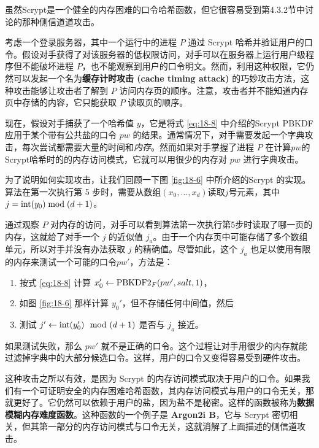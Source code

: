 虽然Scrypt是一个健全的内存困难的口令哈希函数，但它很容易受到第4.3.2节中讨论的那种侧信道道攻击。

考虑一个登录服务器，其中一个运行中的进程 $P$ 通过 Scrypt 哈希并验证用户的口令。假设对手获得了对该服务器的低权限访问，对手可以在服务器上运行用户级程序但不能破坏进程 $P$，也不能观察到用户的口令明文。然而，利用这种权限，它仍然可以发起一个名为\textbf{缓存计时攻击 (cache timing attack)} 的巧妙攻击方法，这种攻击能够让攻击者了解到 $P$ 访问内存页的顺序。注意，攻击者并不能知道内存页中存储的内容，它只能获取 $P$ 读取页的顺序。

现在，假设对手捕获了一个哈希值 $y$，它是将式 \ref{eq:18-8} 中介绍的Scrypt PBKDF应用于某个带有公共盐的口令 $pw$ 的结果。通常情况下，对手需要发起一个字典攻击，每次尝试都需要大量的时间和\emph{内存}。然而如果对手掌握了进程 $P$ 在计算$pw$的Scrypt哈希时的的内存访问模式，它就可以用很少的内存对 $pw$ 进行字典攻击。

为了说明如何实现攻击，让我们回顾一下图 \ref{fig:18-6} 中所介绍的Scrypt 的实现。算法在第一次执行第 5 步时，需要从数组$(x_0,\dots,x_d)$读取$j$号元素，其中$j={\rm int}(y_0)\bmod(d+1)$。

通过观察 $P$ 对内存的访问，对手可以看到算法第一次执行第5步时读取了哪一页的内存，这就给了对手一个 $j$ 的近似值 $j_a$。由于一个内存页中可能存储了多个数组单元，所以对手并没有办法获取 $j$ 的精确值。尽管如此，这个 $j_a$ 也足以使用有限的内存来测试一个可能的口令$pw'$，方法是：
\begin{enumerate}
	\item 按式 \ref{eq:18-8} 计算 $x_0'\leftarrow{\rm PBKDF2}_F(pw',salt,1)$，
	\item 如图 \ref{fig:18-6} 那样计算 $y_0'$，但不存储任何中间值，然后
	\item 测试 $j'\leftarrow{\rm int}(y_0')\mod(d+1)$ 是否与 $j_a$ 接近。
\end{enumerate}

如果测试失败，那么 $pw'$ 就不是正确的口令。这个过程让对手用很少的内存就能过滤掉字典中的大部分候选口令。这样，用户的口令又变得容易受到硬件攻击。

\begin{snote}[一个解决方案.]
这种攻击之所以有效，是因为 Scrypt 的内存访问模式取决于用户的口令。如果我们有一个可证明安全的内存困难哈希函数，其内存访问模式与用户的口令无关，那就更好了。它仍然可以依赖于用户的盐，因为盐不是秘密。这样的函数被称为\textbf{数据模糊内存难度函数}。这种函数的一个例子是 \textbf{Argon2i B}，它与 Scrypt 密切相关，但其第一部分的内存访问模式与口令无关，这就消解了上面描述的侧信道攻击。
\end{snote}

